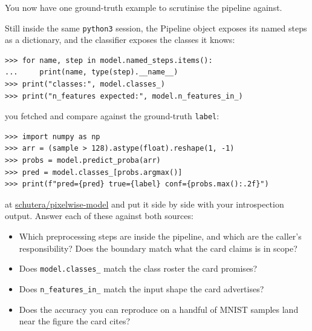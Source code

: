 You now have one ground-truth example to scrutinise the pipeline against.

Still inside the same \texttt{python3} session, the Pipeline object
exposes its named steps as a dictionary, and the classifier exposes the
classes it knows:

\begin{verbatim}
>>> for name, step in model.named_steps.items():
...     print(name, type(step).__name__)
>>> print("classes:", model.classes_)
>>> print("n_features expected:", model.n_features_in_)
\end{verbatim}


 you fetched and compare
against the ground-truth \texttt{label}:

\begin{verbatim}
>>> import numpy as np
>>> arr = (sample > 128).astype(float).reshape(1, -1)
>>> probs = model.predict_proba(arr)
>>> pred = model.classes_[probs.argmax()]
>>> print(f"pred={pred} true={label} conf={probs.max():.2f}")
\end{verbatim}

 at
\href{https://github.com/schutera/pixelwise-model/blob/v1.0/MODELCARD.md}{schutera/pixelwise-model}
and put it side by side with your introspection output.
Answer each of these against both sources:
\begin{itemize}
    \item Which preprocessing steps are inside the pipeline, and which
    are the caller's responsibility?
    Does the boundary match what the card claims is in scope?
    \item Does \texttt{model.classes\_} match the class roster the card
    promises?
    \item Does \texttt{n\_features\_in\_} match the input shape the card
    advertises?
    \item Does the accuracy you can reproduce on a handful of MNIST
    samples land near the figure the card cites?
\end{itemize}

